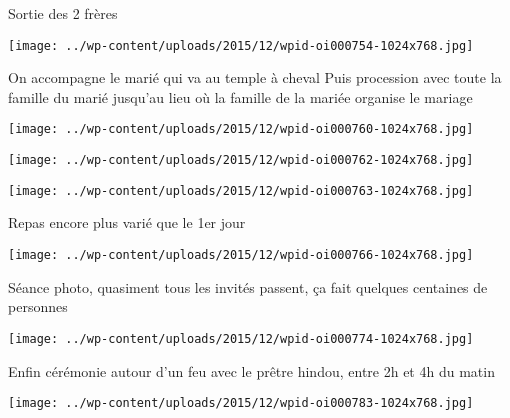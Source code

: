  Sortie des 2 frères \newline
 \newline
\centerline{\texttt{[image: ../wp-content/uploads/2015/12/wpid-oi000754-1024x768.jpg]} } 
 \newline
 On accompagne le marié qui va au temple à cheval \newline
 Puis procession avec toute la famille du marié jusqu'au lieu où la famille de la mariée organise le mariage \newline
 \newline
\centerline{\texttt{[image: ../wp-content/uploads/2015/12/wpid-oi000760-1024x768.jpg]} } 
 \newline
 \newline
\centerline{\texttt{[image: ../wp-content/uploads/2015/12/wpid-oi000762-1024x768.jpg]} } 
 \newline
 \newline
\centerline{\texttt{[image: ../wp-content/uploads/2015/12/wpid-oi000763-1024x768.jpg]} } 
 \newline
 Repas encore plus varié que le 1er jour \newline
 \newline
\centerline{\texttt{[image: ../wp-content/uploads/2015/12/wpid-oi000766-1024x768.jpg]} } 
 \newline
 Séance photo, quasiment tous les invités passent, ça fait quelques centaines de personnes \newline
 \newline
\centerline{\texttt{[image: ../wp-content/uploads/2015/12/wpid-oi000774-1024x768.jpg]} } 
 \newline
 Enfin cérémonie autour d'un feu avec le prêtre hindou, entre 2h et 4h du matin \newline
 \newline
\centerline{\texttt{[image: ../wp-content/uploads/2015/12/wpid-oi000783-1024x768.jpg]} } 
 \newline

\newpage
 

